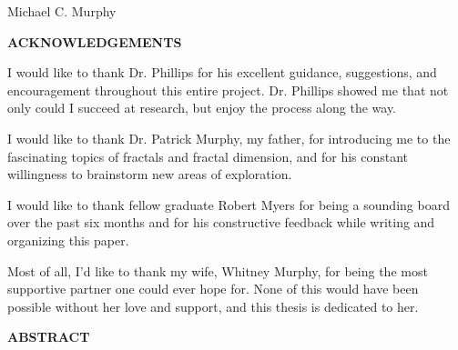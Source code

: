\documentclass[12pt, oneside]{book}
\begin{document}





\thispagestyle{empty}
\pagestyle{fancy}
\lhead{} \chead{} \rhead{}
\lfoot{} \cfoot{\thepage} \rfoot{}
\renewcommand{\headrulewidth}{0pt}
\renewcommand{\footrulewidth}{0pt}
\vspace{2ex}
				{Michael C. Murphy} %


\newpage
\centerline{\textbf{ACKNOWLEDGEMENTS}}

I would like to thank Dr. Phillips for his excellent guidance, suggestions, and encouragement throughout this entire project.  Dr. Phillips showed me that not only could I succeed at research, but enjoy the process along the way.

I would like to thank Dr. Patrick Murphy, my father, for introducing me to the fascinating topics of fractals and fractal dimension, and for his constant willingness to brainstorm new areas of exploration.  

I would like to thank fellow graduate Robert Myers for being a sounding board over the past six months and for his constructive feedback while writing and organizing this paper.  

Most of all, I'd like to thank my wife, Whitney Murphy, for being the most supportive partner one could ever hope for.  None of this would have been possible without her love and support, and this thesis is dedicated to her.


% 
%
\newpage
\centerline{\textbf{ABSTRACT}}
\end{document}
